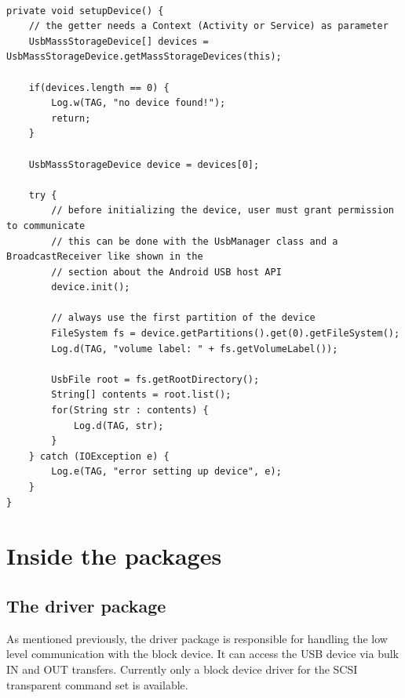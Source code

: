 \lstset{language=Java}
\begin{lstlisting}[caption=Code example for accessing the contents of a mass storage device, label=listing:main_example]

private void setupDevice() {
    // the getter needs a Context (Activity or Service) as parameter
    UsbMassStorageDevice[] devices = UsbMassStorageDevice.getMassStorageDevices(this);
    		
    if(devices.length == 0) {
        Log.w(TAG, "no device found!");
        return;
    }
	
    UsbMassStorageDevice device = devices[0];
	
    try {
        // before initializing the device, user must grant permission to communicate
        // this can be done with the UsbManager class and a BroadcastReceiver like shown in the
        // section about the Android USB host API
        device.init();
		
        // always use the first partition of the device
        FileSystem fs = device.getPartitions().get(0).getFileSystem();
        Log.d(TAG, "volume label: " + fs.getVolumeLabel());
		
        UsbFile root = fs.getRootDirectory();
        String[] contents = root.list();
        for(String str : contents) {
            Log.d(TAG, str);
        }
    } catch (IOException e) {
        Log.e(TAG, "error setting up device", e);
    }
}
\end{lstlisting}

\chapter{Inside the packages}

\section{The driver package}

As mentioned previously, the driver package is responsible for handling the low level communication with the block device. It can access the USB device via bulk IN and OUT transfers. Currently only a block device driver for the SCSI transparent command set is available.

